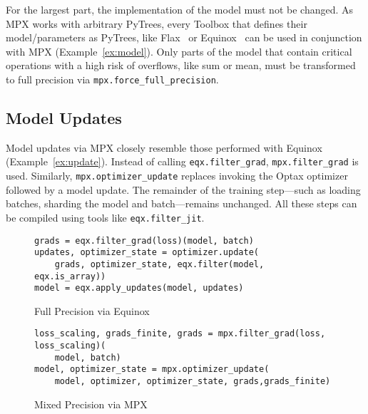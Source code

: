 \documentclass[logo]{dsme}
\newcommand{\mpx}{\textsc{MPX}}
\begin{document}
For the largest part, the implementation of the model must not be changed.
As \mpx{} works with arbitrary PyTrees, every Toolbox that defines their model/parameters as PyTrees, like Flax~\citep{flax2020github} or Equinox~\citep{kidger2021equinox} can be used in conjunction with \mpx{} (Example~\ref{ex:model}). 
Only parts of the model that contain critical operations with a high risk of overflows, like sum or mean, must be transformed to full precision via \texttt{mpx.force\_full\_precision}.


\subsection{Model Updates}
\label{sec:eqxvsmpxmodelupdate}
Model updates via \mpx{} closely resemble those performed with Equinox (Example~\ref{ex:update}). 
Instead of calling \texttt{eqx.filter\_grad}, \texttt{mpx.filter\_grad} is used. Similarly, \texttt{mpx.optimizer\_update} replaces invoking the Optax optimizer followed by a model update.
The remainder of the training step—such as loading batches, sharding the model and batch—remains unchanged. 
All these steps can be compiled using tools like \texttt{eqx.filter\_jit}.


\begin{example}[h]
    \centering
    \begin{subfigure}[t]{0.98\textwidth}
        \centering
        \begin{pbox}[]{}
            \begin{verbatim}
grads = eqx.filter_grad(loss)(model, batch)
updates, optimizer_state = optimizer.update(
    grads, optimizer_state, eqx.filter(model, eqx.is_array))
model = eqx.apply_updates(model, updates)
        \end{verbatim}
    \end{pbox}
        \caption{Full Precision via Equinox}
    \end{subfigure}\hspace{0.1cm}
    \begin{subfigure}[t]{0.98\textwidth}
        \centering
        \begin{pbox}[]{}
            \begin{verbatim}
loss_scaling, grads_finite, grads = mpx.filter_grad(loss, loss_scaling)(
    model, batch)
model, optimizer_state = mpx.optimizer_update(
    model, optimizer, optimizer_state, grads,grads_finite)
            \end{verbatim}
            \end{pbox}
            \caption{Mixed Precision via \mpx{}}
    \end{subfigure}
    \caption{Implementation of model updates via Equinox and \mpx{}. \mpx{} is designed such that its model update routine closely resembles the one of Equinox.}
    \label{ex:update}
\end{example}
\end{document}
